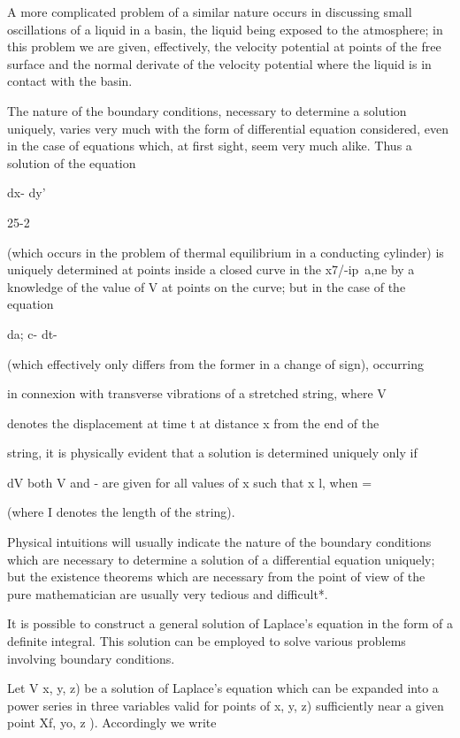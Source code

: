 A more complicated problem of a similar nature occurs in discussing
small oscillations of a liquid in a basin, the liquid being exposed to
the atmosphere; in this problem we are given, effectively, the
velocity potential at points of the free surface and the normal
derivate of the velocity potential where the liquid is in contact with
the basin.

The nature of the boundary conditions, necessary to determine a
solution uniquely, varies very much with the form of differential
equation considered, even in the case of equations which, at first
sight, seem very much alike. Thus a solution of the equation

dx- dy'

25-2

%
%

(which occurs in the problem of thermal equilibrium in a conducting
cylinder) is uniquely determined at points inside a closed curve in
the x7/-ip\ a,ne by a knowledge of the value of V at points on the
curve; but in the case of the equation

da; c- dt-

(which effectively only differs from the former in a change of sign),
occurring

in connexion with transverse vibrations of a stretched string, where V

denotes the displacement at time t at distance x from the end of the

string, it is physically evident that a solution is determined
uniquely only if

dV both V and - are given for all values of x such that x l, when =

(where I denotes the length of the string).

Physical intuitions will usually indicate the nature of the boundary
conditions which are necessary to determine a solution of a
differential equation uniquely; but the existence theorems which are
necessary from the point of view of the pure mathematician are usually
very tedious and difficult*.


It is possible to construct a general solution of Laplace's equation
in the form of a definite integral. This solution can be employed to
solve various problems involving boundary conditions.

Let V x, y, z) be a solution of Laplace's equation which can be
expanded into a power series in three variables valid for points of x,
y, z) sufficiently near a given point Xf, yo, z ). Accordingly we
write

